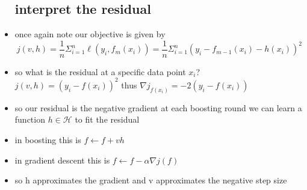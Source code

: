 \documentclass{article}
\begin{document}
\begin{itemize}
\subsection{interpret the residual}
\item once again note our objective is given by $$j(v,h)=\frac{1}{n}\Sigma_{i=1}^{n}\ell(y_i, f_m(x_i))=\frac{1}{n}\Sigma_{i=1}^{n}(y_i-f_{m-1}(x_i)-h(x_i))^2$$
\item so what is the residual at a specific data point $x_i$?
$j(v,h)=(y_i-f(x_i))^2$ thus $\nabla j_{f(x_i)}=-2(y_i-f(x_i))$
\item so our residual is the negative gradient 
\itme at each boosting round we can learn a function $h\in \mathcal{H}$ to fit the residual 
\item in boosting this is $f\leftarrow f+vh$
\item in gradient descent this is $f\leftarrow f-\alpha \nabla j(f)$
\item so h approximates the gradient and v approximates the negative step size

\end{itemize}
\end{document}
